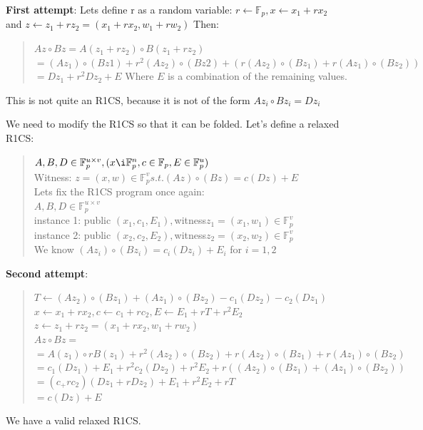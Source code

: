 \textbf{First attempt}: Lets define r as a random variable: $r \leftarrow \mathbb{F}_p, x \leftarrow x_1+rx_2$ 
\\
and $z \leftarrow z_1 + rz_2 = (x_1+rx_2, w_1 + rw_2)$
Then:
\begin{quote}
    $Az \circ Bz = A(z_1 + r z_2) \circ B(z_1 + rz_2)$
    \\
    $= (Az_1) \circ (Bz1) + r^2 (Az_2) \circ (Bz2) + (r(Az_2) \circ (Bz_1) + r(Az_1) \circ (Bz_2))$
    \\
    $=Dz_1 + r^2Dz_2 + E$ Where $E$ is a combination of the remaining values.
    \\
\end{quote}
This is not quite an R1CS, because it is not of the form $Az_i \circ Bz_i = Dz_i$ 

We need to modify the R1CS so that it can be folded. Let's define a relaxed R1CS: 
\begin{quote}
$A, B,D \in \mathbb{F}^{u \times v}_p, (x \i  \mathbb{F}^n_p, c \in \mathbb{F}_p, E \in \mathbb{F}^u_p) $
\\
Witness: $ z = (x,w) \in \mathbb{F}^v_p s.t. (Az) \circ (Bz) = c(Dz) + E$
\\
Lets fix the R1CS program once again:
\\
$A,B,D \in \mathbb{F}^{u \times v}_p $
\\
instance 1: public $ (x_1,c_1,E_1), $witness$ z_1 = (x_1, w_1) \in \mathbb{F}^v_p$
\\
instance 2: public $(x_2,c_2,E_2), $witness$  z_2 = (x_2, w_2) \in \mathbb{F}^v_p$
\\
We know $(Az_i) \circ (Bz_i) = c_i(Dz_i) + E_i$ for $ i = 1,2$
\end{quote}

\textbf{Second attempt}:
\begin{quote}
$T \leftarrow (Az_2) \circ (Bz_1) + (Az_1) \circ (Bz_2) - c_1(Dz_2) - c_2(Dz_1)$
\\
$x \leftarrow x_1 + rx_2, c \leftarrow c_1 + rc_2, E \leftarrow E_1 + rT +r^2E_2$
\\
$z \leftarrow z_1 + rz_2 = (x_1 +rx_2, w_1 + rw_2)$
\\
$Az \circ Bz = $
\\
$=A(z_1) \circ rB(z_1) +r^2(Az_2) \circ (Bz_2) + r(Az_2) \circ (Bz_1) + r(Az_1) \circ (Bz_2)$
\\
$=c_1(Dz_1) + E_1 + r^2c_2(Dz_2) + r^2E_2+r((Az_2) \circ (Bz_1) + (Az_1) \circ (Bz_2))$
\\
$=(c_+rc_2)(Dz_1+rDz_2)+E_1+r^2E_2+rT$
\\
$=c(Dz) + E$
\end{quote}
We have a valid relaxed R1CS.\cite{ZKM10} \cite{FG23}